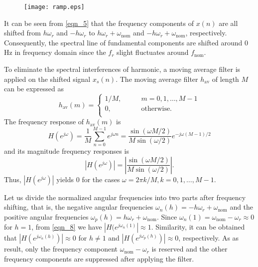 \documentclass[journal,twoside]{IEEEtran}
\begin{document}
\begin{figure}[t]
	\centering
	\texttt{[image: ramp.eps]}
	\label{fig_5}									
\end{figure}

\begin{figure}
	\centering
	
	\label{fig.6}
\end{figure}


It can be seen from  \eqref{eqn_5} that the frequency components of $x(n)$ are all shifted  from $h\omega_r$ and $-h\omega_r$ to $h\omega_r+\omega_\mathrm{nom}$ and $-h\omega_r+\omega_\mathrm{nom}$, respectively. Consequently, the spectral line of fundamental components are shifted around 0 Hz in frequency domain since the $f_r$ slight fluctuates around $f_\mathrm{nom}$.

To eliminate the spectral interferences of harmonic, a moving average filter is applied on the shifted signal $x_s(n)$. The  moving average filter $h_\mathrm{av}$ of length $M$ can be expressed as 
\begin{equation}
h_\mathrm{av}(m)=\begin{cases}
1/M,\qquad &m=0,1,\ldots,M-1\\
0, &\text{otherwise.}\\
\end{cases}\label{eqn_6}
\end{equation}
The frequency response of $h_\mathrm{av}(m)$ is
\begin{equation}
H(e^{j\omega})=\dfrac{1}{M}\sum_{n=0}^{M-1}e^{j\omega n}=\dfrac{\sin(\omega M/2)}{M\sin(\omega/2)}e^{-j\omega (M-1)/2}\label{eqn_7}
\end{equation}
and its magnitude frequency responses is
\begin{equation}
|H(e^{j\omega })|=\left|\dfrac{\sin(\omega M/2)}{M\sin(\omega/2)}\right|\mathrm{.}\label{eqn_8}
\end{equation}
Thus, $|H(e^{j\omega })|$ yields $0$ for the cases $\omega=2\pi k/M,k=0,1,\ldots,M-1$.

Let us divide the normalized angular frequencies into two parts after frequency shifting, that is, the negative angular frequencies $\omega_n(h)=-h\omega_r+\omega_\mathrm{nom}$ and the positive angular frequencies $\omega_p(h)=h\omega_r+\omega_\mathrm{nom}$. Since $\omega_n(1)=\omega_\mathrm{nom}-\omega_r\approx0$ for $h=1$, from \eqref{eqn_8} we have $|H(e^{j\omega_n(1)}|\approx1$. Similarity, it can be obtained that $|H(e^{j\omega_n(h)})|\approx0$ for $h\neq1$ and $|H(e^{j\omega_p(h)})|\approx0$, respectively. As as result, only the frequency component $\omega_\mathrm{nom}-\omega_r$ is reserved and the other frequency components are suppressed after applying the  filter.
\end{document}
